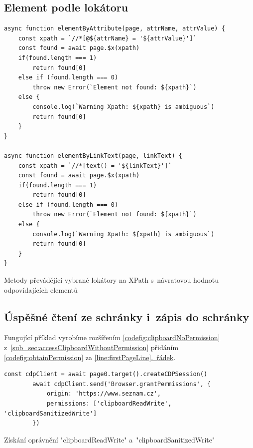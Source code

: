 \documentclass[12pt, a4paper, twoside]{article}
\newcommand{\codefigureSpacing}{1.2}
\newcommand{\refAddedText}[3]{\hyperref[#1]{#2\ref{#1}#3}}
\newcommand{\lineref}[2]{\refAddedText{#1}{}{.~#2}}
\begin{document}
	\subsection{Element podle lokátoru}
	\label{sub_sec:locators2xpath}
	\begin{codefigure}[H]
		\renewcommand\baselinestretch{\codefigureSpacing}
		\begin{lstlisting}[style=MyJavaScript]
async function elementByAttribute(page, attrName, attrValue) {
	const xpath = `//*[@${attrName} = '${attrValue}']`
	const found = await page.$x(xpath)
	if(found.length === 1)
		return found[0]
	else if (found.length === 0)
		throw new Error(`Element not found: ${xpath}`)
	else {
		console.log(`Warning Xpath: ${xpath} is ambiguous`)
		return found[0]
	}
}

async function elementByLinkText(page, linkText) {
	const xpath = `//*[text() = '${linkText}']`
	const found = await page.$x(xpath)
	if(found.length === 1)
		return found[0]
	else if (found.length === 0)
		throw new Error(`Element not found: ${xpath}`)
	else {
		console.log(`Warning Xpath: ${xpath} is ambiguous`)
		return found[0]
	}
}
		\end{lstlisting}
	\captionsetup{justification=centering}
	\caption{Metody převádějící vybrané lokátory na XPath s~návratovou hodnotu odpovídajících elementů}
	\end{codefigure}

  	\subsection{Úspěšné čtení ze schránky i~zápis do schránky}
\label{sub_sec:readingWritingClipboard}
Fungující příklad vyrobíme rozšířením \cref{codefig:clipboardNoPermission} z~\ref{sub_sec:accessClipboardWithoutPermission} přidáním \cref{codefig:obtainPermission} za \lineref{line:firstPageLine}{řádek}.
\begin{codefigure}[H]
	\renewcommand\baselinestretch{\codefigureSpacing}
	\begin{lstlisting}[style=MyJavaScript]
		const cdpClient = await page0.target().createCDPSession()
		await cdpClient.send('Browser.grantPermissions', {
			origin: 'https://www.seznam.cz',
			permissions: ['clipboardReadWrite', 'clipboardSanitizedWrite']
		})
	\end{lstlisting}
	\captionsetup{justification=centering}
	\caption{Získání oprávnění "clipboardReadWrite" a~"clipboardSanitizedWrite"}
	\label{codefig:obtainPermission}
\end{codefigure}
\end{document}
